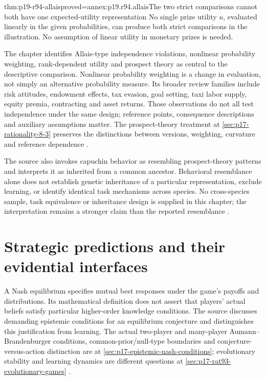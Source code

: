 \begin{hbtheorem}{thm:p19-r94-allais}{proved=annex:p19.r94.allais}{The two strict comparisons cannot both have one expected-utility representation}
No single prize utility \(u\), evaluated linearly in the given
probabilities, can produce both strict comparisons in the illustration.
No assumption of linear utility in monetary prizes is needed.
\end{hbtheorem}

The chapter identifies Allais-type independence violations, nonlinear
probability weighting, rank-dependent utility and prospect theory as central
to the descriptive comparison. Nonlinear probability weighting is a change
in evaluation, not simply an alternative probability measure. Its broader
review families include risk attitudes, endowment effects, tax evasion,
goal setting, taxi labor supply, equity premia, contracting and asset returns.
Those observations do not all test independence under the same design;
reference points, consequence descriptions and auxiliary assumptions matter.
The prospect-theory treatment at \cref{sec:p17-rationality-8-3} preserves
the distinctions between versions, weighting, curvature and reference
dependence \cite[pp.~570--571, note~6]{DhamiAlNowaihi2021Economics}.

The source also invokes capuchin behavior as resembling prospect-theory
patterns and interprets it as inherited from a common ancestor. Behavioral
resemblance alone does not establish genetic inheritance of a particular
representation, exclude learning, or identify identical task mechanisms
across species. No cross-species sample, task equivalence or inheritance
design is supplied in this chapter; the interpretation remains a stronger
claim than the reported resemblance \cite[p.~571]{DhamiAlNowaihi2021Economics}.

\section{Strategic predictions and their evidential interfaces}
\label{sec:p19-r94-games}

A Nash equilibrium specifies mutual best responses under the game's
payoffs and distributions. Its mathematical definition does not assert
that players' actual beliefs satisfy particular higher-order knowledge
conditions. The source discusses demanding epistemic conditions for an
equilibrium conjecture and distinguishes this justification from learning.
The actual two-player and many-player Aumann--Brandenburger conditions,
common-prior/null-type boundaries and conjecture-versus-action distinction
are at \cref{sec:p17-epistemic-nash-conditions}; evolutionary stability and
learning dynamics are different questions at
\cref{sec:p17-rat93-evolutionary-games}
\cite[pp.~567--568]{DhamiAlNowaihi2021Economics}.

